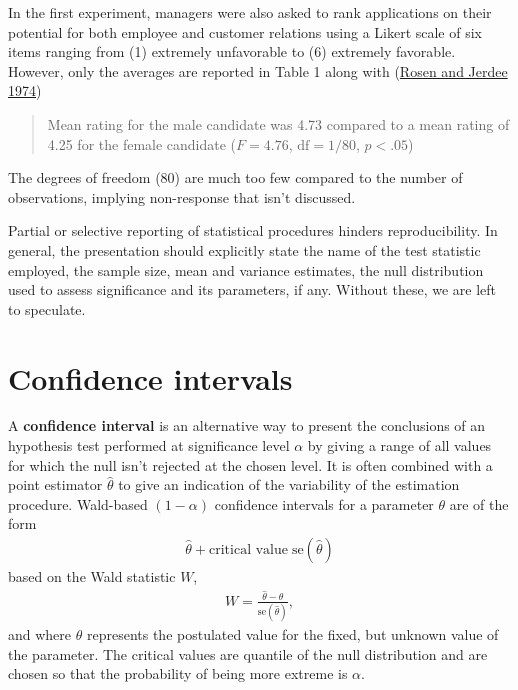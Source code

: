 \documentclass[
  11pt,
  letterpaper,
]{scrbook}
\theoremstyle{definition}
\theoremstyle{remark}
\begin{document}
\begin{tcolorbox}[enhanced jigsaw, breakable, toptitle=1mm, left=2mm, bottomrule=.15mm, colframe=quarto-callout-caution-color-frame, colback=white, rightrule=.15mm, title=\textcolor{quarto-callout-caution-color}{\faFire}\hspace{0.5em}{Pitfall}, opacityback=0, toprule=.15mm, titlerule=0mm, colbacktitle=quarto-callout-caution-color!10!white, bottomtitle=1mm, arc=.35mm, coltitle=black, opacitybacktitle=0.6, leftrule=.75mm]

In the first experiment, managers were also asked to rank applications
on their potential for both employee and customer relations using a
Likert scale of six items ranging from (1) extremely unfavorable to (6)
extremely favorable. However, only the averages are reported in Table 1
along with (\protect\hyperlink{ref-Rosen:1974}{Rosen and Jerdee 1974})

\begin{quote}
Mean rating for the male candidate was 4.73 compared to a mean rating of
4.25 for the female candidate (\(F=4.76\), \(\text{df} = 1/80\),
\(p < .05\))
\end{quote}

The degrees of freedom (80) are much too few compared to the number of
observations, implying non-response that isn't discussed.

Partial or selective reporting of statistical procedures hinders
reproducibility. In general, the presentation should explicitly state
the name of the test statistic employed, the sample size, mean and
variance estimates, the null distribution used to assess significance
and its parameters, if any. Without these, we are left to speculate.

\end{tcolorbox}

\hypertarget{confidence-intervals}{%
\section{Confidence intervals}\label{confidence-intervals}}

A \textbf{confidence interval} is an alternative way to present the
conclusions of an hypothesis test performed at significance level
\(\alpha\) by giving a range of all values for which the null isn't
rejected at the chosen level. It is often combined with a point
estimator \(\hat{\theta}\) to give an indication of the variability of
the estimation procedure. Wald-based \((1-\alpha)\) confidence intervals
for a parameter \(\theta\) are of the form \begin{align*}
\widehat{\theta} + \text{critical value} \; \mathrm{se}(\widehat{\theta})
\end{align*} based on the Wald statistic \(W\), \begin{align*}
W =\frac{\widehat{\theta}-\theta}{\mathrm{se}(\widehat{\theta})},
\end{align*} and where \(\theta\) represents the postulated value for
the fixed, but unknown value of the parameter. The critical values are
quantile of the null distribution and are chosen so that the probability
of being more extreme is \(\alpha\).
\end{document}
